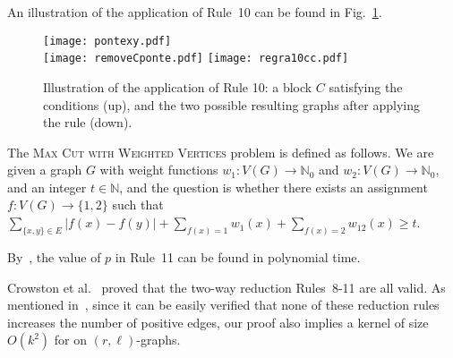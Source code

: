 \documentclass[
final
]{dmtcs-episciences}
\begin{document}
\vspace{.3cm}

An illustration of the application of Rule~10 can be found in Fig.~\ref{fig:Rule10}.

\begin{figure}[h!]
\begin{center} \texttt{[image: pontexy.pdf]}\\
\vspace{.4cm}
  \texttt{[image: removeCponte.pdf]}\hspace{1cm}
\texttt{[image: regra10cc.pdf]}
\caption{Illustration of the application of Rule 10: a block $C$ satisfying the conditions (up), and the two possible resulting graphs after applying the rule (down).} \label{fig:Rule10} \end{center}
\end{figure}

\vspace{.3cm}
The \textsc{Max Cut with Weighted Vertices} problem is defined as follows. We are given a graph $G$ with weight functions $w_1:V(G) \to \mathds{N}_0$ and $w_2:V(G) \to \mathds{N}_0$, and an integer $t \in \mathds{N}$, and the question is whether there exists an assignment $f: V(G) \to \{1,2\}$ such that $\sum_{\{x,y\} \in E} |f(x) - f(y)| + \sum_{f(x) =1}w_1(x) + \sum_{f(x) =2}w_12(x) \geq t$.
\vspace{.3cm}

	

\vspace{.3cm}



By~\cite[Lemma 9]{crowston2012max}, the value of $p$ in Rule~11 can be found in polynomial time.

\vspace{.3cm}

Crowston et al.~\cite{crowston2013maximum} proved that the two-way reduction Rules~8-11 are all valid. As mentioned in~\cite{crowston2013maximum}, since it can be easily verified  that none of these  reduction rules increases the number of positive edges, our proof also implies  a kernel of size $O(k^2)$ for {} on $(r,\ell)$-graphs.
\end{document}
